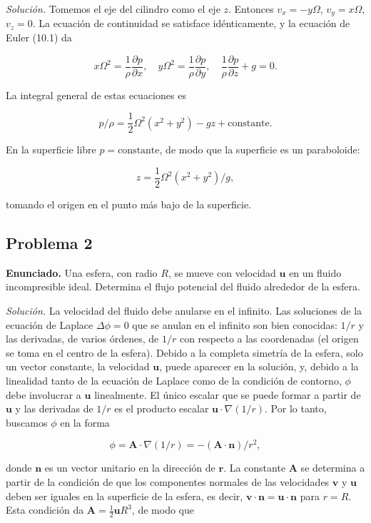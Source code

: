 \documentclass{article}
\begin{document}
\textit{Solución.} Tomemos el eje del cilindro como el eje $z$. Entonces $v_x = -y\Omega$, $v_y = x\Omega$, $v_z = 0$. La ecuación de continuidad se satisface idénticamente, y la ecuación de Euler (10.1) da

$$
x\Omega^2 = \frac{1}{\rho} \frac{\partial p}{\partial x}, \quad y\Omega^2 = \frac{1}{\rho} \frac{\partial p}{\partial y}, \quad \frac{1}{\rho} \frac{\partial p}{\partial z} + g = 0.
$$

La integral general de estas ecuaciones es

$$
p/\rho = \frac{1}{2} \Omega^2 (x^2 + y^2) - gz + \text{constante}.
$$

En la superficie libre $p = \text{constante}$, de modo que la superficie es un paraboloide:

$$
z = \frac{1}{2} \Omega^2 (x^2 + y^2)/g,
$$

tomando el origen en el punto más bajo de la superficie.

\subsection*{Problema 2}

\textbf{Enunciado.} Una esfera, con radio $R$, se mueve con velocidad $\mathbf{u}$ en un fluido incompresible ideal. Determina el flujo potencial del fluido alrededor de la esfera.

\textit{Solución.} La velocidad del fluido debe anularse en el infinito. Las soluciones de la ecuación de Laplace $\Delta \phi = 0$ que se anulan en el infinito son bien conocidas: $1/r$ y las derivadas, de varios órdenes, de $1/r$ con respecto a las coordenadas (el origen se toma en el centro de la esfera). Debido a la completa simetría de la esfera, solo un vector constante, la velocidad $\mathbf{u}$, puede aparecer en la solución, y, debido a la linealidad tanto de la ecuación de Laplace como de la condición de contorno, $\phi$ debe involucrar a $\mathbf{u}$ linealmente. El único escalar que se puede formar a partir de $\mathbf{u}$ y las derivadas de $1/r$ es el producto escalar $\mathbf{u} \cdot \nabla (1/r)$. Por lo tanto, buscamos $\phi$ en la forma

$$
\phi = \mathbf{A} \cdot \nabla (1/r) = -(\mathbf{A} \cdot \mathbf{n})/r^2,
$$

donde $\mathbf{n}$ es un vector unitario en la dirección de $\mathbf{r}$. La constante $\mathbf{A}$ se determina a partir de la condición de que los componentes normales de las velocidades $\mathbf{v}$ y $\mathbf{u}$ deben ser iguales en la superficie de la esfera, es decir, $\mathbf{v} \cdot \mathbf{n} = \mathbf{u} \cdot \mathbf{n}$ para $r = R$. Esta condición da $\mathbf{A} = \frac{1}{2} \mathbf{u} R^3$, de modo que
\end{document}
